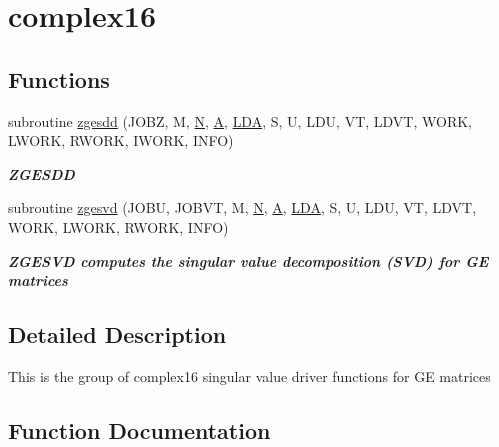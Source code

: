 \hypertarget{group__complex16GEsing}{}\section{complex16}
\label{group__complex16GEsing}
\subsection*{Functions}
\begin{DoxyCompactItemize}
\item 
subroutine \hyperlink{group__complex16GEsing_gaccb06ed106ce18814ad7069dcb43aa27}{zgesdd} (J\+O\+B\+Z, M, \hyperlink{polmisc_8c_a0240ac851181b84ac374872dc5434ee4}{N}, \hyperlink{classA}{A}, \hyperlink{example__user_8c_ae946da542ce0db94dced19b2ecefd1aa}{L\+D\+A}, S, U, L\+D\+U, V\+T, L\+D\+V\+T, W\+O\+R\+K, L\+W\+O\+R\+K, R\+W\+O\+R\+K, I\+W\+O\+R\+K, I\+N\+F\+O)
\begin{DoxyCompactList}\small\item\em {\bfseries Z\+G\+E\+S\+D\+D} \end{DoxyCompactList}\item 
subroutine \hyperlink{group__complex16GEsing_gad6f0c85f3cca2968e1ef901d2b6014ee}{zgesvd} (J\+O\+B\+U, J\+O\+B\+V\+T, M, \hyperlink{polmisc_8c_a0240ac851181b84ac374872dc5434ee4}{N}, \hyperlink{classA}{A}, \hyperlink{example__user_8c_ae946da542ce0db94dced19b2ecefd1aa}{L\+D\+A}, S, U, L\+D\+U, V\+T, L\+D\+V\+T, W\+O\+R\+K, L\+W\+O\+R\+K, R\+W\+O\+R\+K, I\+N\+F\+O)
\begin{DoxyCompactList}\small\item\em {\bfseries  Z\+G\+E\+S\+V\+D computes the singular value decomposition (S\+V\+D) for G\+E matrices} \end{DoxyCompactList}\end{DoxyCompactItemize}


\subsection{Detailed Description}
This is the group of complex16 singular value driver functions for G\+E matrices 

\subsection{Function Documentation}
\hypertarget{group__complex16GEsing_gaccb06ed106ce18814ad7069dcb43aa27}{}
